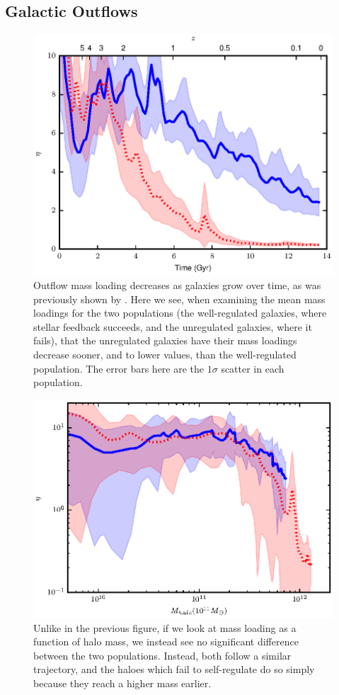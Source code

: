 \subsection{Galactic Outflows}
\begin{figure}
    \includegraphics[width=\columnwidth]{figures3/massloading_time.eps}
    \caption{Outflow mass loading decreases as galaxies grow over time, as
    was previously shown by \citet{Keller2015}.  Here we see, when examining the
    mean mass loadings for the two populations (the well-regulated galaxies,
    where stellar feedback succeeds, and the unregulated galaxies, where it
    fails), that the unregulated galaxies have their mass loadings decrease
    sooner, and to lower values, than the well-regulated population.  The error
bars here are the $1\sigma$ scatter in each population.}
    \label{massloading_time}
\end{figure}
\begin{figure}
    \includegraphics[width=\columnwidth]{figures3/massloading_halo.eps}
    \caption{Unlike in the previous figure, if we look at mass loading as
    a function of halo mass, we instead see no significant difference between
    the two populations.  Instead, both follow a similar trajectory, and the haloes which
    fail to self-regulate do so simply because they reach a higher mass earlier.}
    \label{massloading_halo}
\end{figure}

